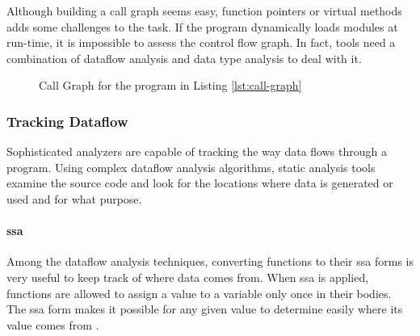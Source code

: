 Although building a call graph seems easy, function pointers or virtual methods adds some challenges to the task. If the program dynamically loads modules at run-time, it is impossible to assess the control flow graph. In fact, tools need a combination of dataflow analysis and data type analysis to deal with it.

\clearpage
    
\begin{figure}[ht]
    \centering
    \caption{Call Graph for the program in Listing \ref{lst:call-graph} \cite{chess2007secure}}
    \label{fig:call-graph}
\end{figure}

\subsubsection{Tracking Dataflow}

Sophisticated analyzers are capable of tracking the way data flows through a program. Using complex dataflow analysis algorithms, static analysis tools examine the source code and look for the locations where data is generated or used and for what purpose.

\paragraph{\gls{ssa}}

Among the dataflow analysis techniques, converting functions to their \gls{ssa} forms is very useful to keep track of where data comes from. When \gls{ssa} is applied, functions are allowed to assign a value to a variable only once in their bodies. The \gls{ssa} form makes it possible for any given value to determine easily where its value comes from \cite{chess2007secure}.


